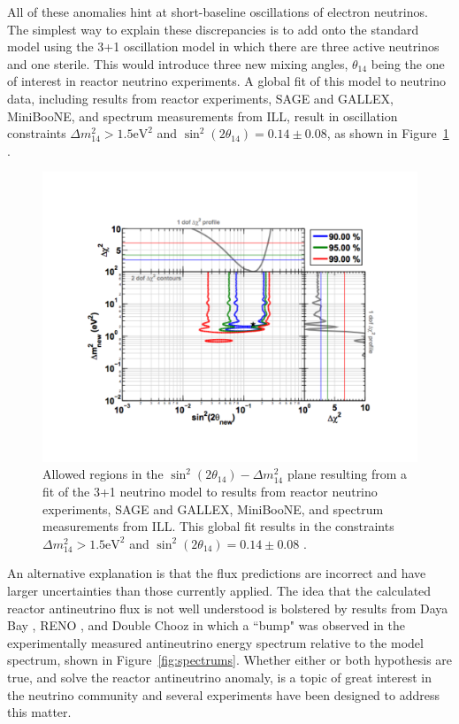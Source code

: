 All of these anomalies hint at short-baseline oscillations of electron neutrinos. 
The simplest way to explain these discrepancies is to add onto the standard model using the 3+1 oscillation model in which there are three active neutrinos and one sterile. This would introduce three new mixing angles, $\theta_{14}$ being the one of interest in reactor neutrino experiments.
A global fit of this model to neutrino data, including results from reactor experiments, SAGE and GALLEX, MiniBooNE, and spectrum measurements from ILL, result in oscillation constraints $\Delta m^2_{14} > 1.5 \textrm{eV}^2$ and $\sin^2(2\theta_{14}) = 0.14 \pm 0.08$, as shown in Figure~\ref{fig:raabestfitpoint} \cite{Mention:2011rk}.

\begin{figure}[t]
	\centering
	\includegraphics[width=0.7\linewidth]{tex/3-reactorneutrinos-images/RAA_BestFitPoint}
	\caption[]{Allowed regions in the $\sin^2(2\theta_{14})-\Delta m^2_{14}$ plane resulting from a fit of the 3+1 neutrino model to results from reactor neutrino experiments, SAGE and GALLEX, MiniBooNE, and spectrum measurements from ILL. This global fit results in the constraints $\Delta m^2_{14} > 1.5 \textrm{eV}^2$ and $\sin^2(2\theta_{14}) = 0.14 \pm 0.08$ \cite{Mention:2011rk}.}
	\label{fig:raabestfitpoint}
\end{figure}

An alternative explanation is that the flux predictions are incorrect and have larger uncertainties than those currently applied. 
The idea that the calculated reactor antineutrino flux is not well understood is bolstered by results from Daya Bay \cite{DayaBayAnomaly}, RENO \cite{Seo:2016uom}, and Double Chooz \cite{DoubleChooz:2019qbj} in which a ``bump" was observed in the experimentally measured antineutrino energy spectrum relative to the model spectrum, shown in Figure~\ref{fig:spectrums}.
Whether either or both hypothesis are true, and solve the reactor antineutrino anomaly, is a topic of great interest in the neutrino community and several experiments have been designed to address this matter.


